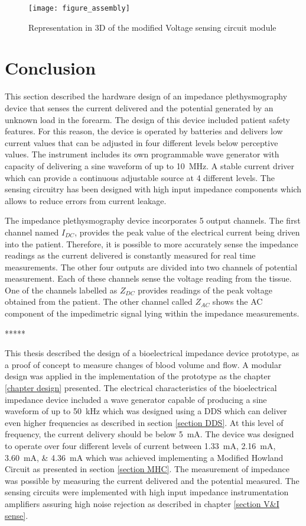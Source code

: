 \begin{figure}[!htpb]
	\centering
	\texttt{[image: figure\_assembly]}
	\caption{Representation in 3D of the modified Voltage sensing circuit module}
	\label{fig:assembly}
\end{figure}

\section{Conclusion}
\label{conclusion impedance device}
This section described the hardware design of an impedance plethysmography device that senses the current delivered and the potential generated by an unknown load in the forearm. The design of this device included patient safety features. For this reason, the device is operated by batteries and delivers low current values that can be adjusted in four different levels below perceptive values. The instrument includes its own programmable wave generator with capacity of delivering a sine waveform of up to \SI{10}{\mega\hertz}. A stable current driver which can provide a continuous adjustable source at 4 different levels. The sensing circuitry has been designed with high input impedance components which allows to reduce errors from current leakage.

The impedance plethysmography device incorporates 5 output channels. The first channel named $I_{DC}$, provides the peak value of the electrical current being driven into the patient. Therefore, it is possible to more accurately sense the impedance readings as the current delivered is constantly measured for real time measurements. The other four outputs are divided into two channels of potential measurement. Each of these channels sense the voltage reading from the tissue. One of the channels labelled as $Z_{DC}$ provides readings of the peak voltage obtained from the patient. The other channel called $Z_{AC}$ shows the AC component of the impedimetric signal lying within the impedance measurements.  


***** 

This thesis described the design of a bioelectrical impedance device prototype, as a proof of concept to measure changes of blood volume and flow. A modular design was applied in the implementation of the prototype as the chapter \ref{chapter design} presented. The electrical characteristics of the bioelectrical impedance device included a wave generator capable of producing a sine waveform of up to \SI{50}{\kHz} which was designed using a DDS which can deliver even higher frequencies as described in section \ref{section DDS}. At this level of frequency, the current delivery should be below \SI{5}{\mA}. The device was designed to operate over four different levels of current between \SIlist{1.33;2.16;3.60;4.36}{\mA} which was achieved implementing a Modified Howland Circuit as presented in section \ref{section MHC}. The measurement of impedance was possible by measuring the current delivered and the potential measured. The sensing circuits were implemented with high input impedance instrumentation amplifiers assuring high noise rejection as described in chapter \ref{section V&I sense}. 


